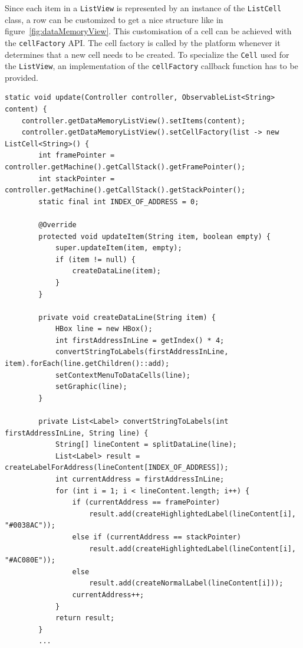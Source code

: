 Since each item in a \lstinline$ListView$ is represented by an instance of the \lstinline$ListCell$ class, a row can be customized to get a nice structure like in figure~\ref{fig:dataMemoryView}. This customisation of a cell can be achieved with the \lstinline$cellFactory$ API. The cell factory is called by the platform whenever it determines that a new cell needs to be created. 
To specialize the \lstinline$Cell$ used for the \lstinline$ListView$, an implementation of the \lstinline$cellFactory$ callback function has to be provided.
\begin{lstlisting}[caption={Implementation of the data memory view using cell factory},label=listing:CellFactory]
static void update(Controller controller, ObservableList<String> content) {
    controller.getDataMemoryListView().setItems(content);
    controller.getDataMemoryListView().setCellFactory(list -> new ListCell<String>() {
        int framePointer = controller.getMachine().getCallStack().getFramePointer();
        int stackPointer = controller.getMachine().getCallStack().getStackPointer();
        static final int INDEX_OF_ADDRESS = 0;

        @Override
        protected void updateItem(String item, boolean empty) {
            super.updateItem(item, empty);
            if (item != null) {
                createDataLine(item);
            }
        }

        private void createDataLine(String item) {
            HBox line = new HBox();
            int firstAddressInLine = getIndex() * 4;
            convertStringToLabels(firstAddressInLine, item).forEach(line.getChildren()::add);
            setContextMenuToDataCells(line);
            setGraphic(line);
        }

        private List<Label> convertStringToLabels(int firstAddressInLine, String line) {
            String[] lineContent = splitDataLine(line);
            List<Label> result = createLabelForAddress(lineContent[INDEX_OF_ADDRESS]);
            int currentAddress = firstAddressInLine;
            for (int i = 1; i < lineContent.length; i++) {
                if (currentAddress == framePointer)
                    result.add(createHighlightedLabel(lineContent[i], "#0038AC"));
                else if (currentAddress == stackPointer)
                    result.add(createHighlightedLabel(lineContent[i], "#AC080E"));
                else
                    result.add(createNormalLabel(lineContent[i]));
                currentAddress++;
            }
            return result;
        }
        ...
\end{lstlisting}

